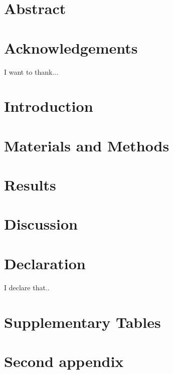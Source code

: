\documentclass[12pt, oneside]{report}
\begin{document}


\chapter*{Abstract}


\chapter*{Acknowledgements}
I want to thank...

\tableofcontents
\listoffigures
\listoftables
\chapter{Introduction}
\label{chapter01}


\chapter{Materials and Methods}
\label{chapter02}


\chapter{Results}
\label{chapter03}


\chapter{Discussion}
\label{discussion}


\chapter*{Declaration}
I declare that..

\appendix
\chapter{Supplementary Tables}

\chapter{Second appendix}

\printbibliography
\end{document}
